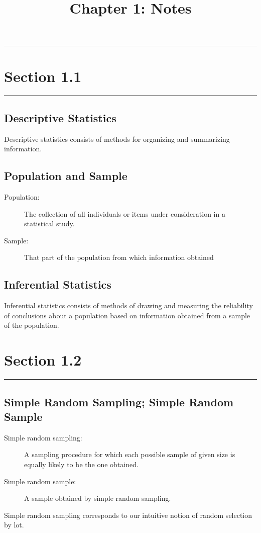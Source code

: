 \documentclass[12pt]{article}
\title{Chapter 1: Notes}
\author{}
\begin{document}
    \maketitle

    \noindent\rule{\textwidth}{0.4pt}
    \section*{Section 1.1}
    \noindent\rule{\textwidth}{0.4pt}
        \subsection*{Descriptive Statistics}
            Descriptive statistics consists of methods for organizing and summarizing
            information.
        \subsection*{Population and Sample}
            \begin{description}
                \item[Population:] The collection of all individuals or items under
                consideration in a statistical study. 
                \item[Sample:] That part of the population from which information obtained 
            \end{description}
        \subsection*{Inferential Statistics}
            Inferential statistics consists of methods of drawing and measuring the
            reliability of conclusions about a population based on information obtained
            from a sample of the population.

    \section*{Section 1.2}
    \noindent\rule{\textwidth}{0.4pt}
        \subsection*{Simple Random Sampling; Simple Random Sample}
            \begin{description}
                \item[Simple random sampling:] A sampling procedure for which each
                possible sample of given size is equally likely to be the one obtained. 
                \item[Simple random sample:] A sample obtained by simple random sampling.
            \end{description}
        Simple random sampling corresponds to our intuitive notion of random selection
        by lot.
\end{document}
